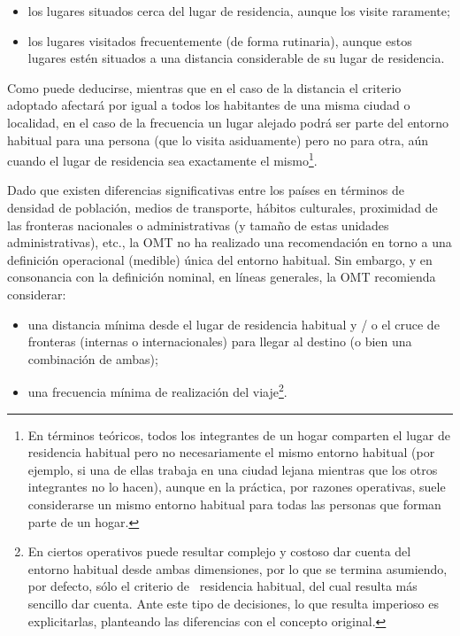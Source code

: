 \documentclass[
]{book}
\begin{document}
\begin{itemize}
\item
  los lugares situados cerca del lugar de residencia, aunque los visite raramente;
\item
  los lugares visitados frecuentemente (de forma rutinaria), aunque estos lugares estén situados a una distancia considerable de su lugar de residencia.
\end{itemize}

Como puede deducirse, mientras que en el caso de la distancia el criterio adoptado afectará por igual a todos los habitantes de una misma ciudad o localidad, en el caso de la frecuencia un lugar alejado podrá ser parte del entorno habitual para una persona (que lo visita asiduamente) pero no para otra, aún cuando el lugar de residencia sea exactamente el mismo\footnote{En términos teóricos, todos los integrantes de un hogar comparten el lugar de residencia habitual pero no necesariamente el mismo entorno habitual (por ejemplo, si una de ellas trabaja en una ciudad lejana mientras que los otros integrantes no lo hacen), aunque en la práctica, por razones operativas, suele considerarse un mismo entorno habitual para todas las personas que forman parte de un hogar.}.

Dado que existen diferencias significativas entre los países en términos de densidad de población, medios de transporte, hábitos culturales, proximidad de las fronteras nacionales o administrativas (y tamaño de estas unidades administrativas), etc., la OMT no ha realizado una recomendación en torno a una definición operacional (medible) única del entorno habitual. Sin embargo, y en consonancia con la definición nominal, en líneas generales, la OMT recomienda considerar:

\begin{itemize}
\item
  una distancia mínima desde el lugar de residencia habitual y / o el cruce de fronteras (internas o internacionales) para llegar al destino (o bien una combinación de ambas);
\item
  una frecuencia mínima de realización del viaje\footnote{En ciertos operativos puede resultar complejo y costoso dar cuenta del entorno habitual desde ambas dimensiones, por lo que se termina asumiendo, por defecto, sólo el criterio de~ residencia habitual, del cual resulta más sencillo dar cuenta. Ante este tipo de decisiones, lo que resulta imperioso es explicitarlas, planteando las diferencias con el concepto original.}.
\end{itemize}
\end{document}
